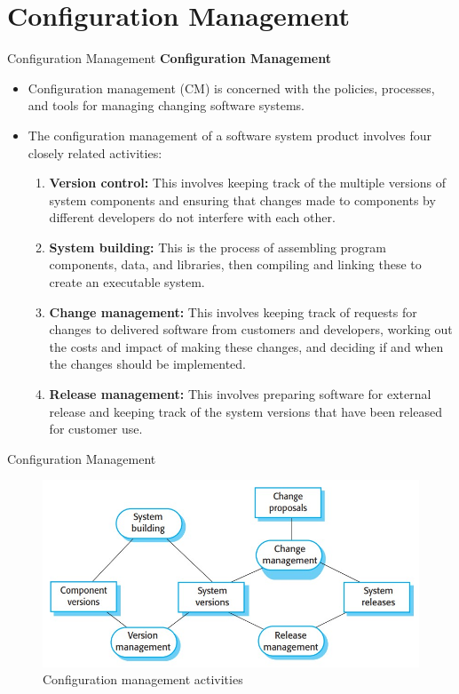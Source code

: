 \documentclass{beamer}
\begin{document}
\section{Configuration Management}
\begin{frame}{Configuration Management}
	\textbf{Configuration Management}
	\begin{itemize}
		\item Configuration management (CM) is concerned with the policies, processes, and tools for managing changing software systems.
		\item The configuration management of a software system product involves four closely related activities:
		\begin{enumerate}
			\item \textbf{Version control:} This involves keeping track of the multiple versions of system components and 
			ensuring that changes made to components by different developers do not interfere with each other.

			\item \textbf{System building:} This is the process of assembling program components, data, and libraries, then 
			compiling and linking these to create an executable system.
			\item \textbf{Change management:} This involves keeping track of requests for changes to delivered software from 
			customers and developers, working out the costs and impact of making these changes, and deciding if 
			and when the changes should be implemented.
			\item \textbf{Release management:} This involves preparing software for external release and keeping track of the 
			system versions that have been released for customer use.
		\end{enumerate}
	\end{itemize}
\end{frame}
\begin{frame}{Configuration Management}
	\begin{figure}
	\includegraphics[scale=.5]{img/m4_9}
	\caption{Configuration 
		management activities}
\end{figure}
\end{frame}
\end{document}
